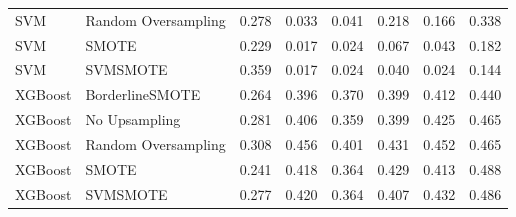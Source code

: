 \begin{tabular}{llllllll}
                         SVM & Random Oversampling & 0.278 &                     0.033 &                 0.041 &                  0.218 &                                   0.166 &     0.338 \\
                         SVM &               SMOTE & 0.229 &                     0.017 &                 0.024 &                  0.067 &                                   0.043 &     0.182 \\
                         SVM &            SVMSMOTE & 0.359 &                     0.017 &                 0.024 &                  0.040 &                                   0.024 &     0.144 \\
                     XGBoost &     BorderlineSMOTE & 0.264 &                     0.396 &                 0.370 &                  0.399 &                                   0.412 &     0.440 \\
                     XGBoost &       No Upsampling & 0.281 &                     0.406 &                 0.359 &                  0.399 &                                   0.425 &     0.465 \\
                     XGBoost & Random Oversampling & 0.308 &                     0.456 &                 0.401 &                  0.431 &                                   0.452 &     0.465 \\
                     XGBoost &               SMOTE & 0.241 &                     0.418 &                 0.364 &                  0.429 &                                   0.413 &     0.488 \\
                     XGBoost &            SVMSMOTE & 0.277 &                     0.420 &                 0.364 &                  0.407 &                                   0.432 &     0.486 \\
\bottomrule
\end{tabular}
